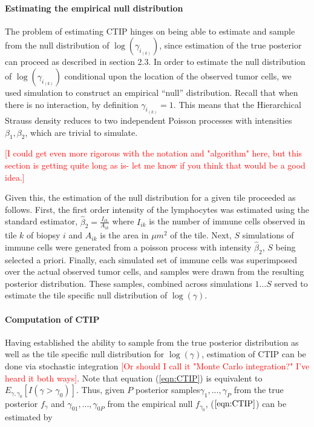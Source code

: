 \documentclass[
]{book}
\begin{document}
\paragraph{\textbf{Estimating the empirical null distribution}}

The problem of estimating CTIP hinges on being able to estimate and sample from the null distribution of \(\log(\gamma_{i_{(k)}})\), since estimation of the true posterior can proceed as described in section 2.3.
In order to estimate the null distribution
of \(\log(\gamma_{i_{(k)}})\) conditional upon the location of the observed tumor cells, we used simulation to construct an empirical ``null'' distribution.
Recall that when there is no interaction, by definition \(\gamma_{i_{(k)}} = 1\). This means that the Hierarchical Strauss density
reduces to two independent Poisson processes with
intensities \(\beta_1, \beta_2\), which are trivial to simulate.

\textcolor{red}{\textsf{[I could get even more rigorous with the notation and "algorithm" here, but this section is getting quite long as is- let me know if you think that would be a good idea.]}}

Given this, the estimation of the null distribution for a given tile proceeded as follows. First, the first order intensity of the lymphocytes was estimated using the standard estimator, \(\hat{\beta}_2 = \frac{I_{ik}}{A_{ik}}\) where \(I_{ik}\) is the number of immune cells observed in tile \(k\) of biopsy \(i\) and \(A_{ik}\) is the area in \(\mu m^2\) of the tile. Next, \(S\) simulations of immune cells were generated from a poisson process with intensity \(\hat{\beta}_2\), \(S\) being selected a priori. Finally, each simulated set of immune cells was superimposed over the actual observed tumor cells, and samples were drawn from the resulting posterior distribution. These samples, combined across simulations \(1...S\) served to estimate the tile specific null distribution of \(\log(\gamma)\).

\paragraph{\textbf{Computation of CTIP}}

Having established the ability to sample from the true posterior distribution as well as the tile specific null distribution for \(\log(\gamma)\), estimation of CTIP can be done via stochastic integration \textcolor{red}{\textsf{[Or should I call it "Monte Carlo integration?" I've heard it both ways]}}. Note that equation (\ref{eqn:CTIP}) is equivalent to \(E_{\gamma, \gamma_0}[I(\gamma > \gamma_0)]\). Thus, given \(P\) posterior samples\(\gamma_1,...,\gamma_P\) from the true posterior \(f_\gamma\) and \(\gamma_{01},...,\gamma_{0P}\) from the empirical null \(f_{\gamma_0}\), (\(\ref{eqn:CTIP}\)) can be estimated by
\end{document}
